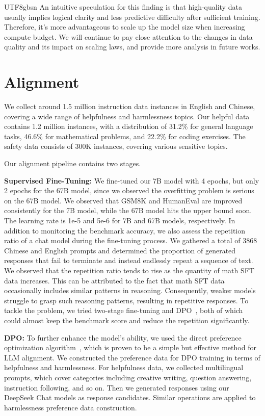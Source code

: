 \documentclass[11pt, a4paper, logo, copyright, nonumbering]{deepseek}
\begin{document}
\begin{CJK*}{UTF8}{gbsn}
An intuitive speculation for this finding is that high-quality data usually implies logical clarity and less predictive difficulty after sufficient training. Therefore, it's more advantageous to scale up the model size when increasing compute budget. We will continue to pay close attention to the changes in data quality and its impact on scaling laws, and provide more analysis in future works.

\section{Alignment}
\label{sec:alignment}

We collect around 1.5 million instruction data instances in English and Chinese, covering a wide range of helpfulness and harmlessness topics.  Our helpful data contains 1.2 million instances,  with a distribution of 31.2\% for general language tasks, 46.6\% for mathematical problems, and 22.2\% for coding exercises. The safety data consists of 300K instances, covering various sensitive topics. 

Our alignment pipeline contains two stages. 

\textbf{Supervised Fine-Tuning: } We fine-tuned our 7B model with 4 epochs, but only 2 epochs for the 67B model, since we observed the overfitting problem is serious on the 67B model. We observed that GSM8K \citep{gsm8k} and HumanEval \citep{codex} are improved consistently for the 7B model, while the 67B model hits the upper bound soon. The learning rate is 1e-5 and 5e-6 for 7B and 67B models, respectively. 
In addition to monitoring the benchmark accuracy, we also assess the repetition ratio of a chat model during the fine-tuning process. We gathered a total of 3868 Chinese and English prompts and determined the proportion of generated responses that fail to terminate and instead endlessly repeat a sequence of text. We observed that the repetition ratio tends to rise as the quantity of math SFT data increases. This can be attributed to the fact that math SFT data occasionally includes similar patterns in reasoning. Consequently, weaker models struggle to grasp such reasoning patterns, resulting in repetitive responses. To tackle the problem, we tried two-stage fine-tuning and DPO~\citep{dpo}, both of which could almost keep the benchmark score and reduce the repetition significantly. 

\textbf{DPO: }To further enhance the model's ability, we used the direct preference optimization algorithm~\citep{dpo}, which is proven to be a simple but effective method for LLM alignment.
We constructed the preference data for DPO training in terms of helpfulness and harmlessness.
For helpfulness data, we collected multilingual prompts, which cover categories including creative writing, question answering, instruction following, and so on. Then we generated responses using our DeepSeek Chat models as response candidates.
Similar operations are applied to harmlessness preference data construction.


\end{CJK*}
\end{document}
